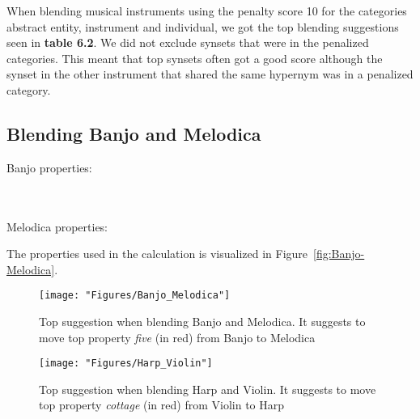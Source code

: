 When blending musical instruments using the penalty score 10 for the categories abstract entity, instrument and individual, we got the top blending suggestions seen in \textbf{table 6.2}. We did not exclude synsets that were in the penalized categories. This meant that top synsets often got a good score although the synset in the other instrument that shared the same hypernym was in a penalized category.

\subsection{Blending Banjo and Melodica}

Banjo properties:

\noindent{}
\\\\Melodica properties:

\noindent{}
	
The properties used in the calculation is visualized in Figure~\ref{fig:Banjo-Melodica}.
		
\begin{figure} \centering \texttt{[image: "Figures/Banjo\_Melodica"]} \caption{Top suggestion when blending Banjo and Melodica. It suggests to move top property \emph{five} (in red) from Banjo to Melodica } \label{ Banjo-Melodica } \end{figure}

\begin{figure} \centering \texttt{[image: "Figures/Harp\_Violin"]} \caption{Top suggestion when blending Harp and Violin. It suggests to move top property \emph{cottage} (in red) from Violin to Harp } \label{ Harp-Violin } \end{figure}

